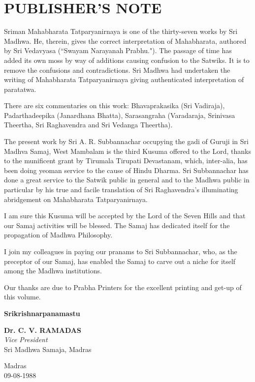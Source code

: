 
\chapter*{PUBLISHER'S NOTE}

Sriman Mahabharata Tatparyanirnaya is one of the thirty-seven works by Sri Madhwa. He, therein, gives the correct interpretation of Mahabharata, authored by Sri Vedavyasa (“Swayam Narayanah Prabhu."). The passage of time has added its own moss by way of additions causing confusion to the Satwiks. It is to remove the confusions and contradictions. Sri Madhwa had undertaken the writing of Mahabharata Tatparyanirnaya giving authenticated interpretation of paratatwa.

There are six commentaries on this work: Bhavaprakasika (Sri Vadiraja), Padarthadeepika (Janardhana Bhatta), Sarasangraha (Varadaraja, Srinivasa Theertha, Sri Raghavendra and Sri Vedanga Theertha).

The present work by Sri A. R. Subbannachar occupying the gadi of Guruji in Sri Madhva Samaj, West Mambalam is the third Kusuma offered to the Lord, thanks to the munificent grant by Tirumala Tirupati Devastanam, which, inter-alia, has been doing yeoman service to the cause of Hindu Dharma. Sri Subbannachar has done a great service to the Satwik public in general and to the Madhwa public in particular by his true and facile translation of Sri Raghavendra's illuminating abridgement on Mahabharata Tatparyanirnaya.

\newpage

I am sure this Kusuma will be accepted by the Lord of the Seven Hills and that our Samaj activities will be blessed. The Samaj has dedicated itself for the propagation of Madhwa Philosophy.

I join my colleagues in paying our pranams to Sri Subbannachar, who, as the preceptor of our Samaj, has enabled the Samaj to carve out a niche for itself among the Madhwa institutions.

Our thanks are due to Prabha Printers for the excellent printing and get-up of this volume.

\begin{center}
\textbf{Srikrishnarpanamastu}
\end{center}

\begin{flushright}
\textbf{Dr. C. V. RAMADAS}\\\textit{Vice President}\\ Sri Madhwa Samaja, Madras
\end{flushright}

\begin{flushleft}
Madras \\ 09-08-1988
\end{flushleft}

